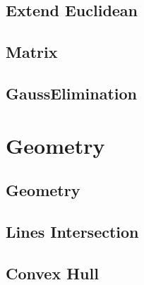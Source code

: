 \subsection{Extend Euclidean}


\subsection{Matrix}



\subsection{GaussElimination}

\section{Geometry}

\subsection{Geometry}


\subsection{Lines Intersection}


\subsection{Convex Hull}

